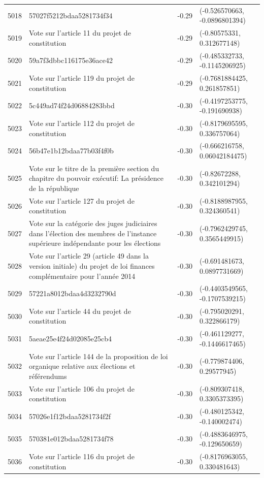\begin{table}[ht]
\begin{tabular}{rlrl}
  5018 & 57027f5212bdaa5281734f34 & -0.29 & (-0.526570663, -0.0896801394) \\ 
  5019 & Vote sur l'article 11 du projet de constitution & -0.29 & (-0.80575331, 0.312677148) \\ 
  5020 & 59a7f3dbbc116175e36ace42 & -0.29 & (-0.485332733, -0.1145206925) \\ 
  5021 & Vote sur l'article 119 du projet de constitution & -0.29 & (-0.7681884425, 0.261857851) \\ 
  5022 & 5c449ad74f24d06884283bbd & -0.30 & (-0.4197253775, -0.191690938) \\ 
  5023 & Vote sur l'article 112 du projet de constitution & -0.30 & (-0.8179695595, 0.336757064) \\ 
  5024 & 56b47e1b12bdaa77b03f4f0b & -0.30 & (-0.666216758, 0.06042184475) \\ 
  5025 & Vote sur le titre de la première section du chapitre du pouvoir exécutif: La présidence de la république & -0.30 & (-0.82672288, 0.342101294) \\ 
  5026 & Vote sur l'article 127 du projet de constitution & -0.30 & (-0.8188987955, 0.324360541) \\ 
  5027 & Vote sur la catégorie des juges judiciaires dans l'élection des membres de l'instance supérieure indépendante pour les élections & -0.30 & (-0.7962429745, 0.3565449915) \\ 
  5028 & Vote sur l'article 29 (article 49 dans la version initiale) du projet de loi finances complémentaire pour l'année 2014 & -0.30 & (-0.691481673, 0.0897731669) \\ 
  5029 & 57221a8012bdaa4d3232790d & -0.30 & (-0.4403549565, -0.1707539215) \\ 
  5030 & Vote sur l'article 44 du projet de constitution & -0.30 & (-0.795020291, 0.322866179) \\ 
  5031 & 5aeae25e4f24d02085e25cb4 & -0.30 & (-0.461129277, -0.1446617465) \\ 
  5032 & Vote sur l'article 144 de la proposition de loi organique relative aux élections et référendums & -0.30 & (-0.779874406, 0.29577945) \\ 
  5033 & Vote sur l'article 106 du projet de constitution & -0.30 & (-0.809307418, 0.3305373395) \\ 
  5034 & 57026e1f12bdaa5281734f2f & -0.30 & (-0.480125342, -0.140002474) \\ 
  5035 & 570381e012bdaa5281734f78 & -0.30 & (-0.4883646975, -0.129650659) \\ 
  5036 & Vote sur l'article 116 du projet de constitution & -0.30 & (-0.8176963055, 0.330481643) \\ 

\end{tabular}
\end{table}
